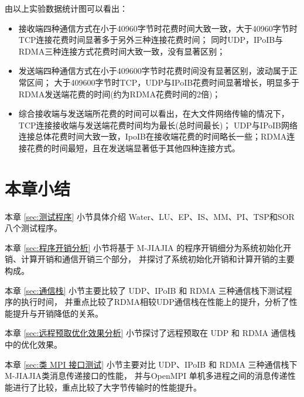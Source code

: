 {    由以上实验数据统计图可以看出：
    \begin{itemize}
        \item 接收端四种通信方式在小于40960字节时花费时间大致一致，大于40960字节时TCP连接花费时间显著多于另外三种连接花费时间；
              同时UDP，IPoIB与RDMA三种连接方式花费时间大致一致，没有显著区别；
        \item 发送端四种通信方式在小于409600字节时花费时间没有显著区别，波动属于正常区间；
              大于409600字节时TCP，UDP与IPoIB花费时间显著增长，明显多于RDMA发送端花费的时间(约为RDMA花费时间的2倍)；
        \item 综合接收端与发送端所花费的时间可以看出，在大文件网络传输的情况下，TCP连接接收端与发送端花费时间均为最长(总时间最长)；
              UDP与IPoIB网络连接总体花费时间大致一致，IpoIB在接收端花费的时间略长一些；RDMA连接花费的时间最短，且在发送端显著低于其他四种连接方式。
    \end{itemize}

    \section{本章小结}
    本章 \ref{sec:测试程序} 小节具体介绍 Water、LU、EP、IS、MM、PI、TSP和SOR 八个测试程序。

    本章 \ref{sec:程序开销分析} 小节将基于 M-JIAJIA 的程序开销细分为系统初始化开销、计算开销和通信开销三个部分，
    并探讨了系统初始化开销和计算开销的主要构成。

    本章 \ref{sec:通信栈} 小节主要比较了 UDP、IPoIB 和 RDMA 三种通信栈下测试程序的执行时间，
    并重点比较了RDMA相较UDP通信栈在性能上的提升，分析了性能提升与开销降低的关系。

    本章 \ref{sec:远程预取优化效果分析} 小节探讨了远程预取在 UDP 和 RDMA 通信栈中的优化效果。

    本章 \ref{sec:类 MPI 接口测试} 小节主要对比 UDP、IPoIB 和 RDMA 三种通信栈下M-JIAJIA类消息传递接口的性能，
    并与OpenMPI 单机多进程之间的消息传递性能进行了比较，重点比较了大字节传输时的性能提升。
}
